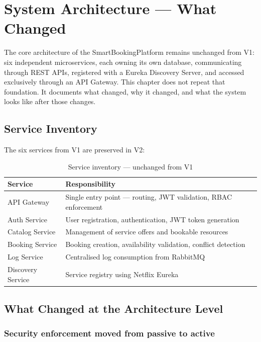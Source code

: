 \section{System Architecture --- What Changed}

The core architecture of the SmartBookingPlatform remains unchanged from V1: six independent microservices, each owning its own database, communicating through REST APIs, registered with a Eureka Discovery Server, and accessed exclusively through an API Gateway. This chapter does not repeat that foundation. It documents what changed, why it changed, and what the system looks like after those changes.

\subsection{Service Inventory}

The six services from V1 are preserved in V2:

\begin{table}[H]
\centering
\begin{tabular}{ll}
\toprule
\textbf{Service} & \textbf{Responsibility} \\
\midrule
API Gateway & Single entry point --- routing, JWT validation, RBAC enforcement \\
Auth Service & User registration, authentication, JWT token generation \\
Catalog Service & Management of service offers and bookable resources \\
Booking Service & Booking creation, availability validation, conflict detection \\
Log Service & Centralised log consumption from RabbitMQ \\
Discovery Service & Service registry using Netflix Eureka \\
\bottomrule
\end{tabular}
\caption{Service inventory --- unchanged from V1}
\end{table}

\subsection{What Changed at the Architecture Level}

\subsubsection{Security enforcement moved from passive to active}

